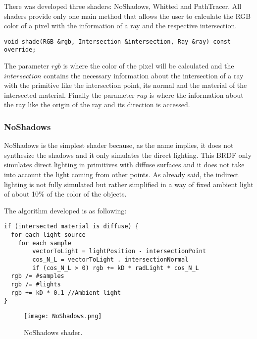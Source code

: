 \par
There was developed three shaders: NoShadows, Whitted and PathTracer.
All shaders provide only one main method that allows the user to calculate the RGB color of a pixel with the information of a ray and the respective intersection.

\begin{lstlisting}
void shade(RGB &rgb, Intersection &intersection, Ray &ray) const override;
\end{lstlisting}

\par
The parameter
$rgb$
is where the color of the pixel will be calculated and the
$intersection$
contains the necessary information about the intersection of a ray with the primitive like the intersection point, its normal and the material of the intersected material.
Finally the parameter
$ray$
is where the information about the ray like the origin of the ray and its direction is accessed.

\subsubsection{NoShadows}

\par
NoShadows is the simplest shader because, as the name implies, it does not synthesize the shadows and it only simulates the direct lighting.
This BRDF only simulates direct lighting in primitives with diffuse surfaces and it does not take into account the light coming from other points.
As already said, the indirect lighting is not fully simulated but rather simplified in a way of fixed ambient light of about 10\% of the color of the objects.

\par
The algorithm developed is as following:

\begin{lstlisting}
if (intersected material is diffuse) {
  for each light source
  	for each sample
	    vectorToLight = lightPosition - intersectionPoint
	    cos_N_L = vectorToLight . intersectionNormal
	    if (cos_N_L > 0) rgb += kD * radLight * cos_N_L
  rgb /= #samples
  rgb /= #lights
  rgb += kD * 0.1 //Ambient light
}
\end{lstlisting}

\begin{figure}[H]
	\centering
	\caption{NoShadows shader.}
	\label{NoShadows shader.}
	\texttt{[image: NoShadows.png]}
\end{figure}

